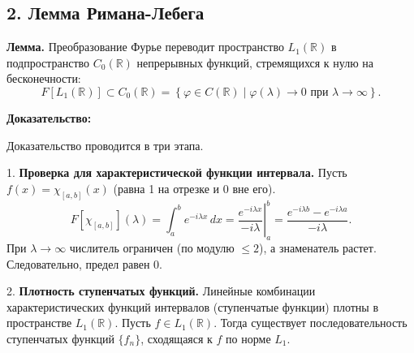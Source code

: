 \documentclass[12pt,a4paper,openany]{book}
\begin{document}
\subsection{2. Лемма Римана-Лебега}

\textbf{Лемма.} Преобразование Фурье переводит пространство $L_1(\mathbb{R})$ в подпространство $C_0(\mathbb{R})$ непрерывных функций, стремящихся к нулю на бесконечности:
\[
F[L_1(\mathbb{R})] \subset C_0(\mathbb{R}) = \left\{ \varphi \in C(\mathbb{R}) \mid \varphi(\lambda) \to 0 \text{ при } \lambda \to \infty \right\}.
\]

\textbf{Доказательство:}

Доказательство проводится в три этапа.

1. \textbf{Проверка для характеристической функции интервала.}
Пусть $f(x) = \chi_{[a, b]}(x)$ (равна 1 на отрезке и 0 вне его).
\[
F[\chi_{[a, b]}](\lambda) = \int_{a}^{b} e^{-i\lambda x} \, dx = \left. \frac{e^{-i\lambda x}}{-i\lambda} \right|_{a}^{b} = \frac{e^{-i\lambda b} - e^{-i\lambda a}}{-i\lambda}.
\]
При $\lambda \to \infty$ числитель ограничен (по модулю $\le 2$), а знаменатель растет. Следовательно, предел равен 0.

2. \textbf{Плотность ступенчатых функций.}
Линейные комбинации характеристических функций интервалов (ступенчатые функции) плотны в пространстве $L_1(\mathbb{R})$. Пусть $f \in L_1(\mathbb{R})$. Тогда существует последовательность ступенчатых функций $\{f_n\}$, сходящаяся к $f$ по норме $L_1$.

\begin{center}
\end{center}
\end{document}
